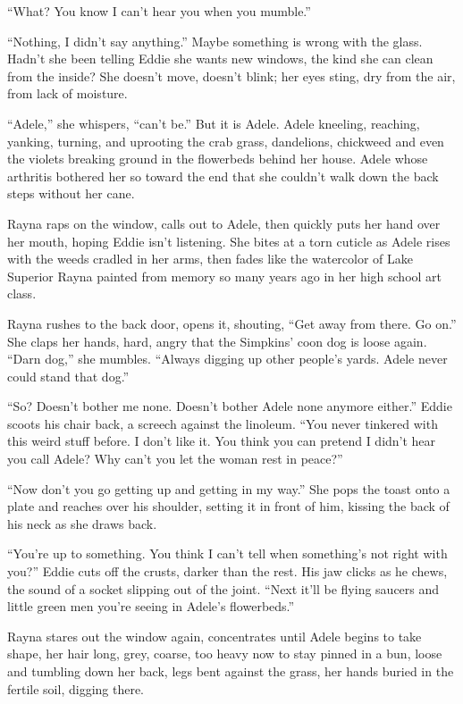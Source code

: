 \documentclass[
]{article}
\begin{document}
``What? You know I can't hear you when you mumble.''

``Nothing, I didn't say anything.'' Maybe something is wrong with the
glass. Hadn't she been telling Eddie she wants new windows, the kind she
can clean from the inside? She doesn't move, doesn't blink; her eyes
sting, dry from the air, from lack of moisture.

``Adele,'' she whispers, ``can't be.'' But it is Adele. Adele kneeling,
reaching, yanking, turning, and uprooting the crab grass, dandelions,
chickweed and even the violets breaking ground in the flower­beds behind
her house. Adele whose arthritis bothered her so toward the end that she
couldn't walk down the back steps without her cane.

Rayna raps on the window, calls out to Adele, then quickly puts her hand
over her mouth, hoping Eddie isn't listening. She bites at a torn
cuticle as Adele rises with the weeds cradled in her arms, then fades
like the watercolor of Lake Superior Rayna painted from memory so many
years ago in her high school art class.

Rayna rushes to the back door, opens it, shouting, ``Get away from
there. Go on.'' She claps her hands, hard, angry that the Simpkins' coon
dog is loose again. ``Darn dog,'' she mumbles. ``Always digging up other
people's yards. Adele never could stand that dog.''

``So? Doesn't bother me none. Doesn't bother Adele none anymore
either.'' Eddie scoots his chair back, a screech against the linoleum.
``You never tinkered with this weird stuff before. I don't like it. You
think you can pretend I didn't hear you call Adele? Why can't you let
the woman rest in peace?''

``Now don't you go getting up and getting in my way.'' She pops the
toast onto a plate and reaches over his shoulder, setting it in front of
him, kissing the back of his neck as she draws back.

``You're up to something. You think I can't tell when something's not
right with you?'' Eddie cuts off the crusts, darker than the rest. His
jaw clicks as he chews, the sound of a socket slipping out of the joint.
``Next it'll be flying saucers and little green men you're seeing in
Adele's flowerbeds.''

Rayna stares out the window again, concentrates until Adele begins to
take shape, her hair long, grey, coarse, too heavy now to stay pinned in
a bun, loose and tumbling down her back, legs bent against the grass,
her hands buried in the fertile soil, digging there.
\end{document}
